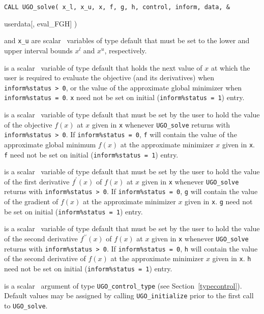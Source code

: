 \documentclass{galahad}
\newcommand{\packagename}{UGO}
\begin{document}
\hspace{8mm}
{\tt CALL \packagename\_solve( x\_l, x\_u, x, f, g, h, control, inform, data, \&
\vspace*{-1mm}

\hspace{37mm}
                        userdata[, eval\_FGH] )}
\vspace*{-2mm}
\begin{description}
 and {\tt x\_u} are scalar \intentin\ variables
of type default \realdp that must be set to the lower and upper
interval bounds $x^l$ and $x^u$, respectively.

 is a scalar \intentinout\ variable of type default \realdp that holds
the next value of $x$ at which the user is required to evaluate the
objective (and its derivatives) when {\tt inform\%status > 0},
or the value of the approximate global minimizer
when {\tt inform\%status = 0}.
{\tt x} need not be set on initial ({\tt inform\%status = 1}) entry.

 is a scalar \intentinout\ variable of type default \realdp that must
be set by the user to hold the value of the objective $f(x)$ at $x$ given
in {\tt x} whenever {\tt \packagename\_solve} returns with
{\tt inform\%status > 0}.
If {\tt inform\%status = 0}, {\tt f} will contain the value of the
approximate global minimum $f(x)$ at the approximate minimizer $x$
given in {\tt x}.
{\tt f} need not be set on initial ({\tt inform\%status = 1}) entry.

 is a scalar \intentinout\ variable of type default \realdp that must
be set by the user to hold the value of the first derivative $f^{\prime}(x)$
of $f(x)$ at $x$ given in {\tt x} whenever {\tt \packagename\_solve} returns
with {\tt inform\%status > 0}. If {\tt inform\%status = 0}, {\tt g}
will contain the value of the gradient of
$f(x)$ at the approximate minimizer $x$ given in {\tt x}.
{\tt g} need not be set on initial ({\tt inform\%status = 1}) entry.

 is a scalar \intentinout\ variable of type default \realdp that must
be set by the user to hold the value of the second derivative $f^{\prime\prime}(x)$
of $f(x)$ at $x$ given in {\tt x} whenever {\tt \packagename\_solve} returns
with {\tt inform\%status > 0}. If {\tt inform\%status = 0}, {\tt h}
will contain the value of the second derivative of
$f(x)$ at the approximate minimizer $x$ given in {\tt x}.
{\tt h} need not be set on initial ({\tt inform\%status = 1}) entry.

 is a scalar \intentin\ argument of type
{\tt \packagename\_control\_type}
(see Section~\ref{typecontrol}). Default values may be assigned by calling
{\tt \packagename\_initialize} prior to the first call to
{\tt \packagename\_solve}.


\end{description}
\end{document}
